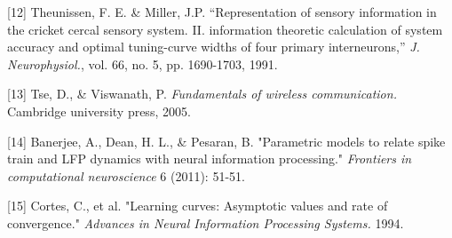 \documentclass{article}
\begin{document}
[12] Theunissen, F. E. \& Miller, J.P. ``Representation of sensory
information in the cricket cercal sensory system. II. information
theoretic calculation of system accuracy and optimal tuning-curve
widths of four primary interneurons,'' \emph{J. Neurophysiol.}, vol. 66,
no. 5, pp. 1690-1703, 1991.

[13] Tse, D., \& Viswanath, P. \emph{Fundamentals of wireless
communication.} Cambridge university press, 2005.

[14] Banerjee, A., Dean, H. L.,  \& Pesaran, B. "Parametric
models to relate spike train and LFP dynamics with neural information
processing." \emph{Frontiers in computational neuroscience} 6 (2011): 51-51.

[15] Cortes, C., et al. "Learning curves: Asymptotic values and rate of convergence." \emph{Advances in Neural Information Processing Systems.} 1994.
\end{document}
